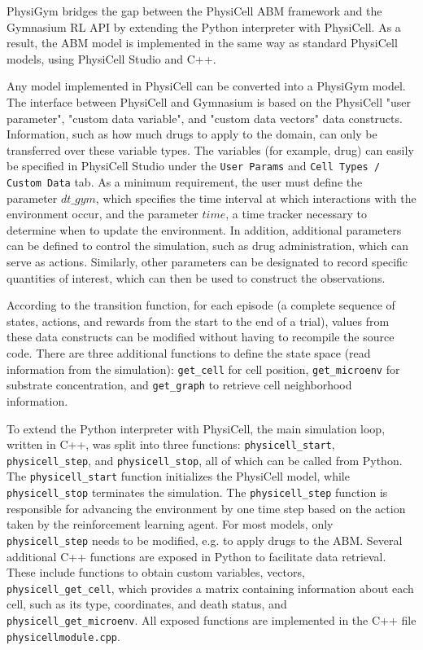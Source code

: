 \documentclass{article}
\begin{document}
PhysiGym bridges the gap between the PhysiCell ABM framework and the Gymnasium RL API by extending the Python interpreter \citep{rossum1995extending, psf2024extending} with PhysiCell. As a result, the ABM model is implemented in the same way as standard PhysiCell models, using PhysiCell Studio \citep{heiland2024physicellstudio} and C++.  

Any model implemented in PhysiCell can be converted into a PhysiGym model. 
The interface between PhysiCell and Gymnasium is based on the PhysiCell "user parameter", "custom data variable", and "custom data vectors" data constructs. Information, such as how much drugs to apply to the domain, can only be transferred over these variable types. The variables (for example, drug) can easily be specified in PhysiCell Studio under the \texttt{User Params} and \texttt{Cell Types / Custom Data} tab.
As a minimum requirement, the user must define the parameter $dt\_gym$, which specifies the time interval at which interactions with the environment occur, and the parameter $time$, a time tracker necessary to determine when to update the environment.
In addition, additional parameters can be defined to control the simulation, such as drug administration, which can serve as actions. Similarly, other parameters can be designated to record specific quantities of interest, which can then be used to construct the observations.

According to the transition function, for each episode (a complete sequence of states, actions, and rewards from the start to the end of a trial), values from these data constructs can be modified without having to recompile the source code.
There are three additional functions to define the state space (read information from the simulation): \texttt{get\_cell} for cell position, \texttt{get\_microenv} for substrate concentration, and \texttt{get\_graph} to retrieve cell neighborhood information. 

To extend the Python interpreter with PhysiCell, the main simulation loop, written in C++, was split into three functions: \texttt{physicell\_start}, \texttt{physicell\_step}, and \texttt{physicell\_stop}, all of which can be called from Python. 
The \texttt{physicell\_start} function initializes the PhysiCell model, while \texttt{physicell\_stop} terminates the simulation. 
The \texttt{physicell\_step} function is responsible for advancing the environment by one time step based on the action taken by the reinforcement learning agent.
For most models, only \texttt{physicell\_step} needs to be modified, e.g. to apply drugs to the ABM.
Several additional C++ functions are exposed in Python to facilitate data retrieval.
These include functions to obtain custom variables, vectors, \texttt{physicell\_get\_cell}, which provides a matrix containing information about each cell, such as its type, coordinates, and death status, and \texttt{physicell\_get\_microenv}.
All exposed functions are implemented in the C++ file \texttt{physicellmodule.cpp}.
\end{document}
